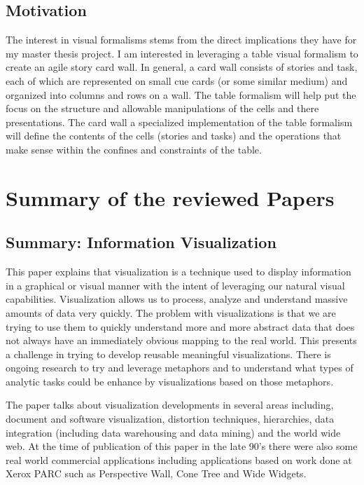 \documentclass{sig-alternate}
\begin{document}
\subsection{Motivation}
The interest in visual formalisms stems from the direct implications they have
for my master thesis project. I am interested in leveraging a table visual
formalism to create an agile story card wall. In general, a card wall consists
of stories and task, each of which are represented on small cue cards (or some
similar medium) and organized into columns and rows on a wall. The table
formalism will help put the focus on the structure and allowable manipulations
of the cells and there presentations. The card wall  a specialized
implementation of the table formalism will define the contents of the cells
(stories and tasks) and the operations that make sense within the confines and
constraints of the table.
\section{Summary of the reviewed Papers}
\subsection{Summary: Information Visualization\cite{Gershon:1998:Informationvisualization}}
This paper explains that visualization is a technique used to display
information in a graphical or visual manner with the intent of leveraging our
natural visual capabilities. Visualization allows us to process, analyze and
understand massive amounts of data very quickly. The problem with visualizations
is that we are trying to use them to quickly understand more and more abstract
data that does not always have an immediately obvious mapping to the real world.
This presents a challenge in trying to develop reusable meaningful
visualizations. There is ongoing research to try and leverage metaphors and to
understand what types of analytic tasks could be enhance by visualizations based
on those metaphors.

The paper talks about visualization developments in several areas including,
document and software visualization, distortion techniques, hierarchies, data
integration (including data warehousing and data mining) and the world wide web.
At the time of publication of this paper in the late 90's there were also some
real world commercial applications including applications based on work done at
Xerox PARC such as Perspective Wall, Cone Tree and Wide Widgets.
\end{document}
